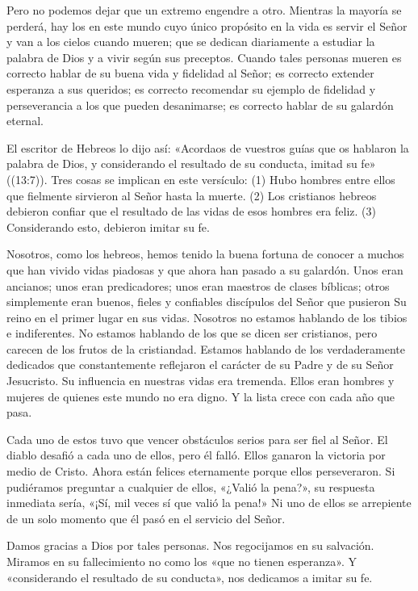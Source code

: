 \documentclass[12pt, twoside, openright]{book}
\begin{document}
Pero no podemos dejar que un extremo engendre a otro. Mientras la mayoría se perderá, hay los en este mundo cuyo único propósito en la vida es servir el Señor y van a los cielos cuando mueren; que se dedican diariamente a estudiar la palabra de Dios y a vivir según sus preceptos. Cuando tales personas mueren es correcto hablar de su buena vida y fidelidad al Señor; es correcto extender esperanza a sus queridos; es correcto recomendar su ejemplo de fidelidad y perseverancia a los que pueden desanimarse; es correcto hablar de su galardón eternal.

El escritor de Hebreos lo dijo así: «Acordaos de vuestros guías que os hablaron la palabra de Dios, y considerando el resultado de su conducta, imitad su fe» ((13:7)). Tres cosas se implican en este versículo: (1) Hubo hombres entre ellos que fielmente sirvieron al Señor hasta la muerte. (2) Los cristianos hebreos debieron confiar que el resultado de las vidas de esos hombres era feliz. (3) Considerando esto, debieron imitar su fe.

Nosotros, como los hebreos, hemos tenido la buena fortuna de conocer a muchos que han vivido vidas piadosas y que ahora han pasado a su galardón. Unos eran ancianos; unos eran predicadores; unos eran maestros de clases bíblicas; otros simplemente eran buenos, fieles y confiables discípulos del Señor que pusieron Su reino en el primer lugar en sus vidas. Nosotros no estamos hablando de los tibios e indiferentes. No estamos hablando de los que se dicen ser cristianos, pero carecen de los frutos de la cristiandad. Estamos hablando de los verdaderamente dedicados que constantemente reflejaron el carácter de su Padre y de su Señor Jesucristo. Su influencia en nuestras vidas era tremenda. Ellos eran hombres y mujeres de quienes este mundo no era digno. Y la lista crece con cada año que pasa. 

Cada uno de estos tuvo que vencer obstáculos serios para ser fiel al Señor. El diablo desafió a cada uno de ellos, pero él falló. Ellos ganaron la victoria por medio de Cristo. Ahora están felices eternamente porque ellos perseveraron. Si pudiéramos preguntar a cualquier de ellos, «¿Valió la pena?», su respuesta inmediata sería, «¡Sí, mil veces sí que valió la pena!» Ni uno de ellos se arrepiente de un solo momento que él pasó en el servicio del Señor.

Damos gracias a Dios por tales personas. Nos regocijamos en su salvación. Miramos en su fallecimiento no como los «que no tienen esperanza». Y «considerando el resultado de su conducta», nos dedicamos a imitar su fe.
\end{document}
